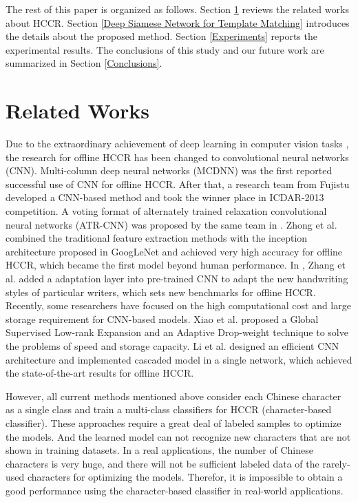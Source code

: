 \documentclass[conference]{IEEEtran}
\begin{document}
The rest of this paper is organized as follows. Section \ref{Related Works} reviews the related works about HCCR. Section \ref{Deep Siamese Network for Template Matching} introduces the details about the proposed method. Section \ref{Experiments}
reports the experimental results. The conclusions of this study and our future work are summarized in Section \ref{Conclusions}.

\section{Related Works}
\label{Related Works}
Due to the extraordinary achievement of deep learning in computer vision tasks\cite{krizhevsky2012imagenet,simonyan2015very,szegedy2015going,he2016deep} , the research for offline HCCR has been changed to convolutional neural networks (CNN). 
Multi-column deep neural networks (MCDNN)\cite{ciregan2012multi-column}\cite{ciresan2015multi-column} was the first reported successful use of CNN for offline HCCR. After that, a research team from Fujistu developed a CNN-based method and took the winner place in ICDAR-2013 competition\cite{yin2013icdar}. A voting format of alternately trained relaxation convolutional neural networks (ATR-CNN) was proposed by the same team in \cite{wu2014handwritten}. Zhong et al.\cite{zhong2015high} combined the traditional feature extraction methods with the inception architecture proposed in GoogLeNet\cite{szegedy2015going} and achieved very high accuracy for offline HCCR, which became the first model beyond human performance. In \cite{zhang2017online}, Zhang et al. added a adaptation layer into pre-trained CNN to adapt the new handwriting styles of particular writers, which sets new benchmarks for offline HCCR. 
Recently, some researchers have focused on the high computational cost and large storage requirement for CNN-based models.
 Xiao et al.\cite{xiao2017building} proposed a Global Supervised Low-rank Expansion and an Adaptive Drop-weight technique to solve
 the problems of speed and storage capacity. Li et al.\cite{li2018building} designed an efficient CNN architecture and implemented cascaded model in a single network, which achieved the state-of-the-art results for offline HCCR.

However, all current methods mentioned above consider each Chinese character as a single class and train a multi-class classifiers for HCCR (character-based classifier). These approaches require a great deal of labeled samples to optimize the models. And the learned model can not recognize new characters that are not shown in training datasets. In a real applications, the number of Chinese characters is very huge, and there will not be sufficient labeled data of the rarely-used characters for optimizing the models. Therefor, it is impossible to obtain a good performance using the character-based classifier in real-world applications.
\end{document}
